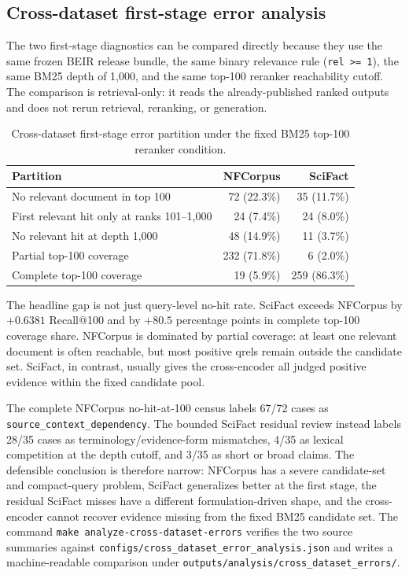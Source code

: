 \documentclass[11pt,a4paper]{article}
\makeatletter
\newcommand{\recallH}{Recall@100}
\newcommand{\bmtwofive}{BM25}
\makeatother
\begin{document}
\subsection{Cross-dataset first-stage error analysis}
\label{sec:cross-dataset-errors}

The two first-stage diagnostics can be compared directly because they
use the same frozen BEIR release bundle, the same binary relevance rule
(\texttt{rel >= 1}), the same \bmtwofive{} depth of 1,000, and the same
top-100 reranker reachability cutoff.  The comparison is retrieval-only:
it reads the already-published ranked outputs and does not rerun
retrieval, reranking, or generation.

\begin{table}[H]
  \centering\small
  \caption{Cross-dataset first-stage error partition under the fixed
  \bmtwofive{} top-100 reranker condition.}
  \label{tab:cross-dataset-errors}
  \begin{tabularx}{\linewidth}{Xrr}
    \toprule
    Partition & NFCorpus & SciFact \\
    \midrule
    No relevant document in top 100 & 72 (22.3\%) & 35 (11.7\%) \\
    First relevant hit only at ranks 101--1,000 & 24 (7.4\%) & 24 (8.0\%) \\
    No relevant hit at depth 1,000 & 48 (14.9\%) & 11 (3.7\%) \\
    Partial top-100 coverage & 232 (71.8\%) & 6 (2.0\%) \\
    Complete top-100 coverage & 19 (5.9\%) & 259 (86.3\%) \\
    \bottomrule
  \end{tabularx}
\end{table}

The headline gap is not just query-level no-hit rate.  SciFact exceeds
NFCorpus by $+0.6381$ \recallH{} and by $+80.5$ percentage points in
complete top-100 coverage share.  NFCorpus is dominated by partial
coverage: at least one relevant document is often reachable, but most
positive qrels remain outside the candidate set.  SciFact, in contrast,
usually gives the cross-encoder all judged positive evidence within the
fixed candidate pool.

The complete NFCorpus no-hit-at-100 census labels 67/72 cases as
\texttt{source\_context\_dependency}.  The bounded SciFact residual
review instead labels 28/35 cases as terminology/evidence-form
mismatches, 4/35 as lexical competition at the depth cutoff, and 3/35
as short or broad claims.  The defensible conclusion is therefore
narrow: NFCorpus has a severe candidate-set and compact-query problem,
SciFact generalizes better at the first stage, the residual SciFact
misses have a different formulation-driven shape, and the
cross-encoder cannot recover evidence missing from the fixed
\bmtwofive{} candidate set.  The command
\texttt{make analyze-cross-dataset-errors} verifies the two source
summaries against \texttt{configs/cross\_dataset\_error\_analysis.json}
and writes a machine-readable comparison under
\texttt{outputs/analysis/cross\_dataset\_errors/}.
\end{document}
